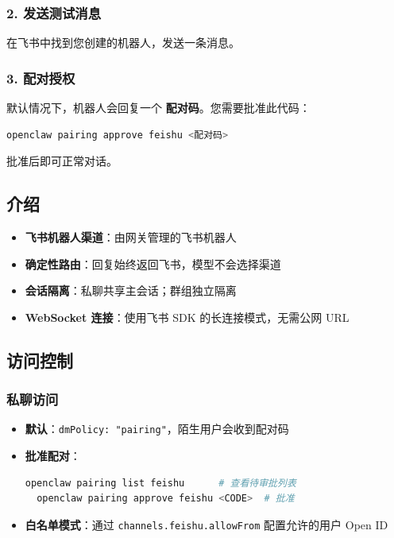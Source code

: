 \subsubsection{2. 发送测试消息}


在飞书中找到您创建的机器人，发送一条消息。

\subsubsection{3. 配对授权}


默认情况下，机器人会回复一个 \textbf{配对码}。您需要批准此代码：

\begin{lstlisting}[language=bash]
openclaw pairing approve feishu <配对码>
\end{lstlisting}


批准后即可正常对话。

\hrulefill


\subsection{介绍}


\begin{itemize}
  \item \textbf{飞书机器人渠道}：由网关管理的飞书机器人
  \item \textbf{确定性路由}：回复始终返回飞书，模型不会选择渠道
  \item \textbf{会话隔离}：私聊共享主会话；群组独立隔离
  \item \textbf{WebSocket 连接}：使用飞书 SDK 的长连接模式，无需公网 URL
\end{itemize}


\hrulefill


\subsection{访问控制}


\subsubsection{私聊访问}


\begin{itemize}
  \item \textbf{默认}：\texttt{dmPolicy: "pairing"}，陌生用户会收到配对码
  \item \textbf{批准配对}：
\begin{lstlisting}[language=bash]
  openclaw pairing list feishu      # 查看待审批列表
  openclaw pairing approve feishu <CODE>  # 批准
\end{lstlisting}

  \item \textbf{白名单模式}：通过 \texttt{channels.feishu.allowFrom} 配置允许的用户 Open ID
\end{itemize}


